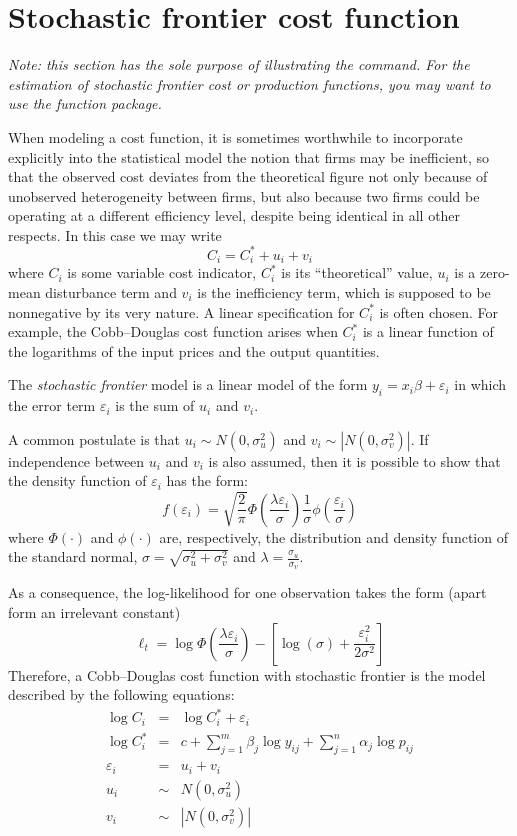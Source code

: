 \section{Stochastic frontier cost function}
\label{sec:frontier}

\emph{%
Note: this section has the sole purpose of illustrating the 
command. For the estimation of stochastic frontier cost or production
functions, you may want to use the  function package.}

When modeling a cost function, it is sometimes worthwhile to
incorporate explicitly into the statistical model the notion that
firms may be inefficient, so that the observed cost deviates from the
theoretical figure not only because of unobserved heterogeneity
between firms, but also because two firms could be operating at a
different efficiency level, despite being identical in all other
respects. In this case we may write
\[
  C_i = C^*_i + u_i + v_i
\]
where $C_i$ is some variable cost indicator, $C_i^*$ is its
``theoretical'' value, $u_i$ is a zero-mean disturbance term and $v_i$
is the inefficiency term, which is supposed to be nonnegative by its
very nature. A linear specification for $C_i^*$ is often chosen. For
example, the Cobb--Douglas cost function arises when $C_i^*$ is a
linear function of the logarithms of the input prices and the output
quantities.

The \emph{stochastic frontier} model is a linear model of the form
$y_i = x_i \beta + \varepsilon_i$ in which the error term
$\varepsilon_i$ is the sum of $u_i$ and $v_i$.  

A common postulate is that $u_i \sim N(0,\sigma_u^2)$ and
$v_i \sim \left|N(0,\sigma_v^2)\right|$. If independence between $u_i$
and $v_i$ is also assumed, then it is possible to show that the
density function of $\varepsilon_i$ has the form:
\begin{equation}
  \label{eq:frontdens}
  f(\varepsilon_i) = 
   \sqrt{\frac{2}{\pi}} 
   \Phi\left(\frac{\lambda \varepsilon_i}{\sigma}\right)
   \frac{1}{\sigma} \phi\left(\frac{\varepsilon_i}{\sigma}\right)
\end{equation}
where $\Phi(\cdot)$ and $\phi(\cdot)$ are, respectively, the distribution and density
function of the standard normal, $\sigma =
\sqrt{\sigma^2_u + \sigma^2_v}$ and $\lambda = \frac{\sigma_u}{\sigma_v}$.

As a consequence, the log-likelihood for one observation takes the
form (apart form an irrelevant constant)
\[
  \ell_t = 
  \log\Phi\left(\frac{\lambda \varepsilon_i}{\sigma}\right) -
  \left[ \log(\sigma) + \frac{\varepsilon_i^2}{2 \sigma^2} \right]
\]
Therefore, a Cobb--Douglas cost function with stochastic frontier is the
model described by the following equations: 
\begin{eqnarray*}
  \log C_i & = & \log C^*_i + \varepsilon_i \\
  \log C^*_i & = & c + \sum_{j=1}^m \beta_j \log y_{ij} + \sum_{j=1}^n \alpha_j \log p_{ij} \\
  \varepsilon_i & = & u_i + v_i \\
  u_i & \sim & N(0,\sigma_u^2) \\
  v_i & \sim & \left|N(0,\sigma_v^2)\right| 
\end{eqnarray*}


